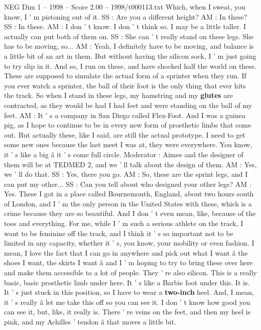\begin{textsample}{NEG Dim 1 – 1998 – Score 2.00 – 1998/t000113.txt}
Which, when I sweat, you know, I ' m pistoning out of it.
SS : Are you a different height?
AM : In these?
SS : In these.
AM : I don ' t know.
I don ' t think so.
I may be a little taller.
I actually can put both of them on.
SS : She can ' t really stand on these legs.
She has to be moving, so...
AM : Yeah, I definitely have to be moving, and balance is a little bit of an art in them.
But without having the silicon sock, I ' m just going to try slip in it.
And so, I run on these, and have shocked half the world on these.
These are supposed to simulate the actual form of a sprinter when they run.
If you ever watch a sprinter, the ball of their foot is the only thing that ever hits the track.
So when I stand in these legs, my hamstring and my \textbf{glutes} are contracted, as they would be had I had feet and were standing on the ball of my feet.
AM : It ' s a company in San Diego called Flex-Foot.
And I was a guinea pig, as I hope to continue to be in every new form of prosthetic limbs that come out.
But actually these, like I said, are still the actual prototype.
I need to get some new ones because the last meet I was at, they were everywhere.
You know, it ' s like a big â it ' s come full circle.
Moderator : Aimee and the designer of them will be at TEDMED 2, and we ' ll talk about the design of them.
AM : Yes, we ' ll do that.
SS : Yes, there you go.
AM : So, these are the sprint legs, and I can put my other...
SS : Can you tell about who designed your other legs?
AM : Yes.
These I got in a place called Bournemouth, England, about two hours south of London, and I ' m the only person in the United States with these, which is a crime because they are so beautiful.
And I don ' t even mean, like, because of the toes and everything.
For me, while I ' m such a serious athlete on the track, I want to be feminine off the track, and I think it ' s so important not to be limited in any capacity, whether it ' s, you know, your mobility or even fashion.
I mean, I love the fact that I can go in anywhere and pick out what I want â the shoes I want, the skirts I want â and I ' m hoping to try to bring these over here and make them accessible to a lot of people.
They ' re also silicon.
This is a really basic, basic prosthetic limb under here.
It ' s like a Barbie foot under this.
It is.
It ' s just stuck in this position, so I have to wear a \textbf{two-inch} heel.
And, I mean, it ' s really â let me take this off so you can see it.
I don ' t know how good you can see it, but, like, it really is.
There ' re veins on the feet, and then my heel is pink, and my Achilles ' tendon â that moves a little bit.

\end{textsample}
